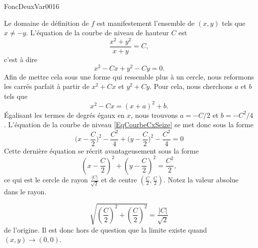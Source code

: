 

\begin{corrige}{FoncDeuxVar0016}

	Le domaine de définition de $f$ est manifestement l'ensemble de $(x,y)$ tels que $x\neq -y$. L'équation de la courbe de niveau de hauteur $C$ est
	\begin{equation}
		\frac{ x^2+y^2 }{ x+y }=C,
	\end{equation}
	c'est à dire
	\begin{equation}
		x^2-Cx+y^2-Cy=0.
	\end{equation}
	Afin de mettre cela sous une forme qui ressemble plus à un cercle, nous reformons les carrés parfait à partir de $x^2+Cx$ et $y^2+Cy$. Pour cela, nous cherchons $a$ et $b$ tels que
	\begin{equation}	\label{EqCourbeCxSeize}
		x^2-Cx=(x+a)^2+b.
	\end{equation}
	Égalisant les termes de degrés égaux en $x$, nous trouvons $a=-C/2$ et $b=-C^2/4$. L'équation de la courbe de niveau \eqref{EqCourbeCxSeize} se met donc sous la forme
	\begin{equation}
		\big( x-\frac{ C }{ 2 } \big)^2-\frac{ C^2 }{ 4 }+\big( y-\frac{ C }{ 2 } \big)^2-\frac{ C^2 }{ 4 }=0
	\end{equation}
	Cette dernière équation se récrit avantageusement sous la forme
	\begin{equation}
		\left( x-\frac{ C }{2} \right)^2+\left( y-\frac{ C }{2} \right)^2=\frac{ C^2 }{2},
	\end{equation}
	ce qui est le cercle de rayon $\frac{ | C | }{  \sqrt{2} }$ et de centre $(\frac{ C }{2},\frac{ C }{2})$. Notez la valeur absolue dans le rayon.

	\begin{equation}
		\sqrt{ \left( \frac{ C }{ 2 } \right)^2+\left( \frac{ C }{ 2 } \right)^2 }=\frac{ | C | }{ \sqrt{2} }
	\end{equation}
	de l'origine. Il est donc hors de question que la limite existe quand $(x,y)\to(0,0)$.

\end{corrige}

